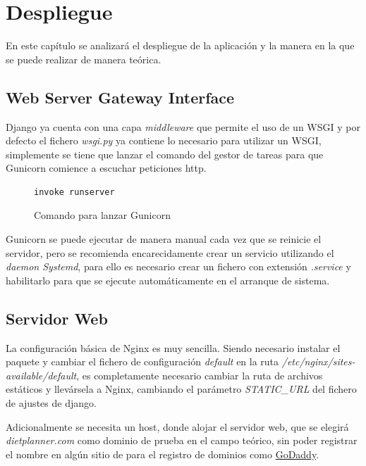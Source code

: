 \chapter{Despliegue}
En este capítulo se analizará el despliegue de la aplicación y la manera en la que se puede realizar de manera teórica.

\section{Web Server Gateway Interface}
Django ya cuenta con una capa \emph{\gls{middleware}} que permite el uso de un \gls{WSGI} y por defecto el fichero \emph{wsgi.py} ya contiene lo necesario para utilizar un \gls{WSGI}, simplemente se tiene que lanzar el comando del gestor de tareas para que Gunicorn comience a escuchar peticiones \gls{http}. 
\begin{figure}[H!]
    \begin{lstlisting}[style=C, caption={Métodos de la base de datos utilizados para buscar recetas por ingredientes}]
        invoke runserver
    \end{lstlisting}
        \caption{Comando para lanzar Gunicorn}
        \label{cmd:gunicorn}
    \end{figure}

Gunicorn se puede ejecutar de manera manual cada vez que se reinicie el servidor, pero se recomienda encarecidamente crear un servicio utilizando el \emph{\gls{daemon} Systemd}, para ello es necesario crear un fichero con extensión \emph{.service} y habilitarlo para que se ejecute automáticamente en el arranque de sistema.

\section{Servidor Web}
La configuración básica de Nginx es muy sencilla. Siendo necesario instalar el paquete y cambiar el fichero de configuración \textit{default} en la ruta \textit{/etc/nginx/sites-available/default}, es completamente necesario cambiar la ruta de archivos estáticos y llevársela a Nginx, cambiando el parámetro \textit{STATIC\_URL} del fichero de ajustes de \gls{django}. 

Adicionalmente se necesita un host, donde alojar el servidor web, que se elegirá \textit{dietplanner.com} como dominio de prueba en el campo teórico, sin poder registrar el nombre en algún sitio de para el registro de dominios como \href{https://www.godaddy.com/es-es}{GoDaddy}.

